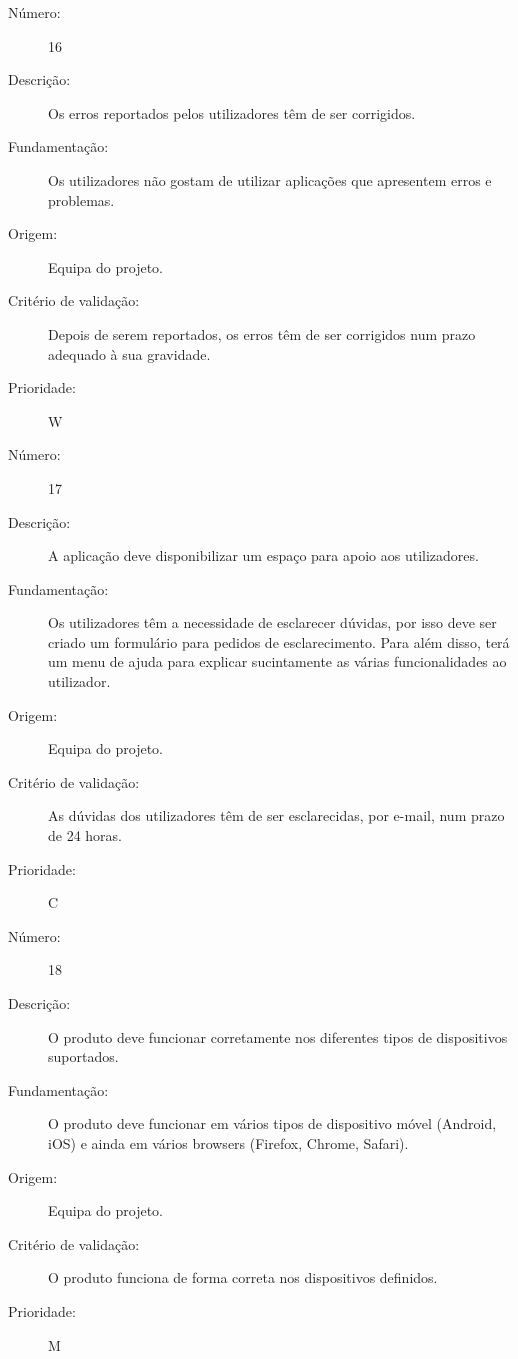 \documentclass[12pt,a4paper]{article}
\begin{document}
      \begin{description}
        \item[Número:]16
        \item[Descrição:]Os erros reportados pelos utilizadores têm de ser corrigidos.
        \item[Fundamentação:] Os utilizadores não gostam de utilizar aplicações que apresentem erros e problemas.
        \item[Origem:]Equipa do projeto.
        \item[Critério de validação:]Depois de serem reportados, os erros têm de ser corrigidos num prazo adequado à sua gravidade.
        \item[Prioridade:]W
      \end{description}
      \vspace{0.5cm}

      \begin{description}
        \item[Número:]17
        \item[Descrição:]A aplicação deve disponibilizar um espaço para apoio aos utilizadores.
        \item[Fundamentação:]Os utilizadores têm a necessidade de esclarecer dúvidas, por isso deve ser criado um formulário para pedidos de esclarecimento. Para além disso, terá um menu de ajuda para explicar sucintamente as várias funcionalidades ao utilizador.
        \item[Origem:]Equipa do projeto.
        \item[Critério de validação:]As dúvidas dos utilizadores têm de ser esclarecidas, por e-mail, num prazo de 24 horas.
        \item[Prioridade:]C
      \end{description}
      \vspace{0.5cm}

            \begin{description}
        \item[Número:]18
        \item[Descrição:]O produto deve funcionar corretamente nos diferentes tipos de dispositivos suportados.
        \item[Fundamentação:]O produto deve funcionar em vários tipos de dispositivo móvel (Android, iOS) e ainda em vários browsers (Firefox, Chrome, Safari).
        \item[Origem:]Equipa do projeto.
        \item[Critério de validação:]O produto funciona de forma correta nos dispositivos definidos.
        \item[Prioridade:]M
      \end{description}
\end{document}
